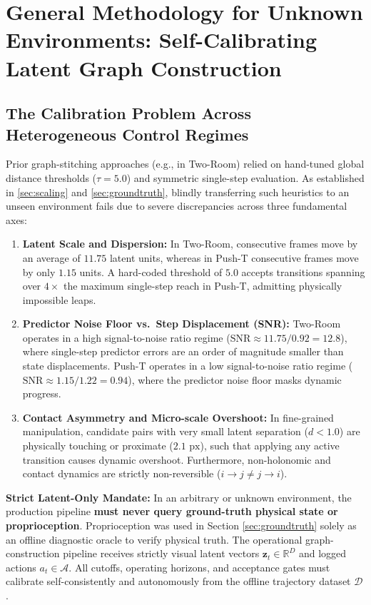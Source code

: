 \documentclass[11pt]{article}
\newcommand{\zv}{\mathbf{z}}
\begin{document}
\section{General Methodology for Unknown Environments: Self-Calibrating Latent Graph Construction}
\label{sec:unknown-environments}

\subsection{The Calibration Problem Across Heterogeneous Control Regimes}
\label{sec:calibration-problem}

Prior graph-stitching approaches (e.g., in Two-Room) relied on hand-tuned global distance thresholds
($\tau = 5.0$) and symmetric single-step evaluation. As established in \cref{sec:scaling} and \cref{sec:groundtruth},
blindly transferring such heuristics to an unseen environment fails due to severe discrepancies across three fundamental axes:
\begin{enumerate}[leftmargin=1.4em,itemsep=2pt]
\item \textbf{Latent Scale and Dispersion:} In Two-Room, consecutive frames move by an average of $11.75$ latent units,
whereas in Push-T consecutive frames move by only $1.15$ units. A hard-coded threshold of $5.0$ accepts transitions spanning
over $4\times$ the maximum single-step reach in Push-T, admitting physically impossible leaps.
\item \textbf{Predictor Noise Floor vs.\ Step Displacement (SNR):} Two-Room operates in a high signal-to-noise ratio regime
($\mathrm{SNR} \approx 11.75 / 0.92 = 12.8$), where single-step predictor errors are an order of magnitude smaller than
state displacements. Push-T operates in a low signal-to-noise ratio regime ($\mathrm{SNR} \approx 1.15 / 1.22 = 0.94$), where the
predictor noise floor masks dynamic progress.
\item \textbf{Contact Asymmetry and Micro-scale Overshoot:} In fine-grained manipulation, candidate pairs with very small
latent separation ($d < 1.0$) are physically touching or proximate ($2.1\text{ px}$), such that applying any active transition
causes dynamic overshoot. Furthermore, non-holonomic and contact dynamics are strictly non-reversible ($i \to j \ne j \to i$).
\end{enumerate}

\textbf{Strict Latent-Only Mandate:} In an arbitrary or unknown environment, the production pipeline
\textbf{must never query ground-truth physical state or proprioception}. Proprioception was used in Section \ref{sec:groundtruth}
solely as an offline diagnostic oracle to verify physical truth. The operational graph-construction pipeline receives
strictly visual latent vectors $\zv_t \in \mathbb{R}^D$ and logged actions $a_t \in \mathcal{A}$. All cutoffs, operating horizons,
and acceptance gates must calibrate self-consistently and autonomously from the offline trajectory dataset $\mathcal{D}$.
\end{document}
